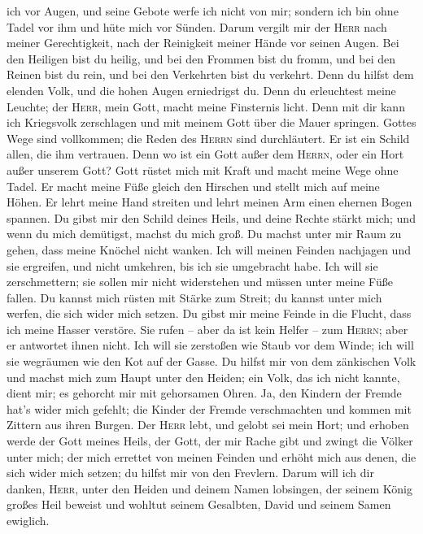 ich vor Augen, und seine Gebote werfe ich nicht von mir; 
sondern ich bin ohne Tadel vor ihm und hüte mich vor Sünden.
 Darum vergilt mir der \textsc{Herr} nach meiner
Gerechtigkeit, nach der Reinigkeit meiner Hände vor seinen Augen.
 Bei den Heiligen bist du heilig, und bei den Frommen
bist du fromm,  und bei den Reinen bist du rein, und bei
den Verkehrten bist du verkehrt.  Denn du hilfst dem
elenden Volk, und die hohen Augen erniedrigst du.  Denn
du erleuchtest meine Leuchte; der \textsc{Herr}, mein Gott, macht meine
Finsternis licht.  Denn mit dir kann ich Kriegsvolk
zerschlagen und mit meinem Gott über die Mauer springen. 
Gottes Wege sind vollkommen; die Reden des \textsc{Herrn} sind
durchläutert. Er ist ein Schild allen, die ihm vertrauen.
 Denn wo ist ein Gott außer dem \textsc{Herrn}, oder ein
Hort außer unserem Gott?  Gott rüstet mich mit Kraft und
macht meine Wege ohne Tadel.  Er macht meine Füße gleich
den Hirschen und stellt mich auf meine Höhen.  Er lehrt
meine Hand streiten und lehrt meinen Arm einen ehernen Bogen spannen.
 Du gibst mir den Schild deines Heils, und deine Rechte
stärkt mich; und wenn du mich demütigst, machst du mich groß.
 Du machst unter mir Raum zu gehen, dass meine Knöchel
nicht wanken.  Ich will meinen Feinden nachjagen und sie
ergreifen, und nicht umkehren, bis ich sie umgebracht habe.
 Ich will sie zerschmettern; sie sollen mir nicht
widerstehen und müssen unter meine Füße fallen.  Du
kannst mich rüsten mit Stärke zum Streit; du kannst unter mich werfen,
die sich wider mich setzen.  Du gibst mir meine Feinde in
die Flucht, dass ich meine Hasser verstöre.  Sie rufen --
aber da ist kein Helfer -- zum \textsc{Herrn}; aber er antwortet ihnen
nicht.  Ich will sie zerstoßen wie Staub vor dem Winde;
ich will sie wegräumen wie den Kot auf der Gasse.  Du
hilfst mir von dem zänkischen Volk und machst mich zum Haupt unter den
Heiden; ein Volk, das ich nicht kannte, dient mir;  es
gehorcht mir mit gehorsamen Ohren. Ja, den Kindern der Fremde hat's
wider mich gefehlt;  die Kinder der Fremde verschmachten
und kommen mit Zittern aus ihren Burgen.  Der
\textsc{Herr} lebt, und gelobt sei mein Hort; und erhoben werde der Gott
meines Heils,  der Gott, der mir Rache gibt und zwingt
die Völker unter mich;  der mich errettet von meinen
Feinden und erhöht mich aus denen, die sich wider mich setzen; du hilfst
mir von den Frevlern.  Darum will ich dir danken,
\textsc{Herr}, unter den Heiden und deinem Namen lobsingen,
 der seinem König großes Heil beweist und wohltut seinem
Gesalbten, David und seinem Samen ewiglich.

